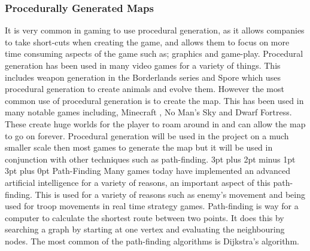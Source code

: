 \documentclass[12pt,a4paper,oneside]{book}
\makeatletter
\renewcommand\subsection{\@startsection {subsection}{1}{2mm} %
                               {3pt plus 2pt minus 1pt} %
                               {3pt plus 0pt} %
                               {\normalfont\bfseries}}
\makeatother
\begin{document}
\subsubsection{Procedurally Generated Maps}
It is very common in gaming to use procedural generation, as it allows companies to take short-cuts when creating the game, and allows them to focus on more time consuming aspects of the game such as; graphics and game-play. Procedural generation has been used in many video games for a variety of things. This includes weapon generation in the Borderlands series and Spore which uses procedural generation to create animals and evolve them. However the most common use of procedural generation is to create the map. This has been used in many notable games including, Minecraft , No Man’s Sky and Dwarf Fortress. These create huge worlds for the player to roam around in and can allow the map to go on forever. Procedural generation will be used in the project on a much smaller scale then most games to generate the map but it will be used in conjunction with other techniques such as path-finding.  
\vspace{5mm} 
\newline
\subsection{Path-Finding}
Many games today have implemented an advanced artificial intelligence for a variety of reasons, an important aspect of this path-finding. This is used for a variety of reasons such as enemy’s movement and being used for troop movements in real time strategy games. Path-finding is way for a computer to calculate the shortest route between two points. It does this by searching a graph by starting at one vertex and evaluating the neighbouring nodes. The most common of the path-finding algorithms is Dijkstra's algorithm.	
\end{document}
